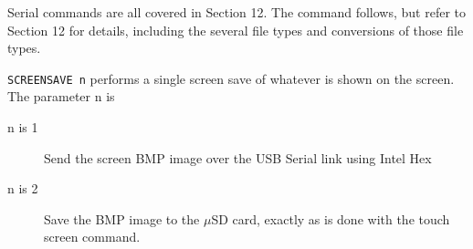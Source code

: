 Serial commands are all covered in Section 12.  The command follows, but refer to Section 12 for details, including the several file types and conversions of those file types.

\texttt{SCREENSAVE n} performs a single screen save of whatever is shown on the screen.  The parameter n is
\begin{description}
\item[n is 1] Send the screen BMP image over the USB Serial link using Intel Hex
\item[n is 2] Save the BMP image to the $\mu$SD card, exactly as is done with the touch screen command.
\end{description}
